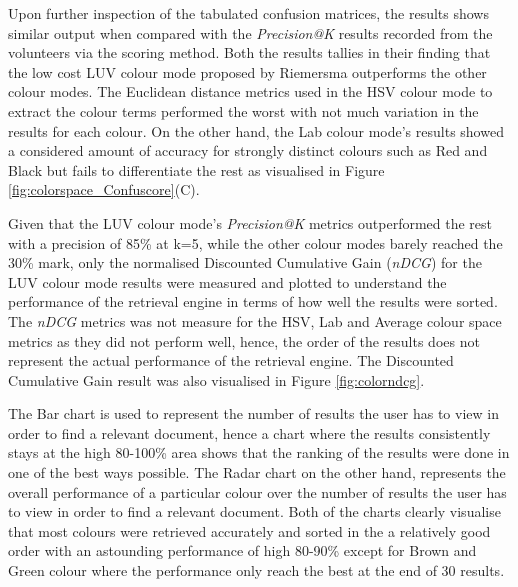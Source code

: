 Upon further inspection of the tabulated confusion matrices, the results shows
similar output when compared with the \textit{Precision@K} results recorded
from the volunteers via the scoring method. Both the results tallies in their
finding that the low cost LUV colour mode proposed by Riemersma\cite{riemersma}
outperforms the other colour modes. The Euclidean distance metrics used in the
HSV colour mode to extract the colour terms performed the worst with not much
variation in the results for each colour. On the other hand, the Lab colour
mode's results showed a considered amount of accuracy for strongly distinct
colours such as Red and Black but fails to differentiate the rest as visualised
in Figure \ref{fig:colorspace_Confuscore}(C).

Given that the LUV colour mode's \textit{Precision@K} metrics outperformed the
rest with a precision of 85\% at k=5, while the other colour modes barely
reached the 30\% mark, only the normalised Discounted Cumulative Gain
(\textit{nDCG}) for the LUV colour mode results were measured and plotted to
understand the performance of the retrieval engine in terms of how well the
results were sorted. The \textit{nDCG} metrics was not measure for the HSV, Lab
and Average colour space metrics as they did not perform well, hence, the order
of the results does not represent the actual performance of the retrieval
engine. The Discounted Cumulative Gain result was also visualised in
Figure \ref{fig:colorndcg}.

The Bar chart is used to represent the number of results the user has to view
in order to find a relevant document, hence a chart where the results
consistently stays at the high 80-100\% area shows that the ranking of the
results were done in one of the best ways possible. The Radar chart on the
other hand, represents the overall performance of a particular colour over the
number of results the user has to view in order to find a relevant document.
Both of the charts clearly visualise that most colours were retrieved
accurately and sorted in the a relatively good order with an astounding
performance of high 80-90\% except for Brown and Green colour where the
performance only reach the best at the end of 30 results.


